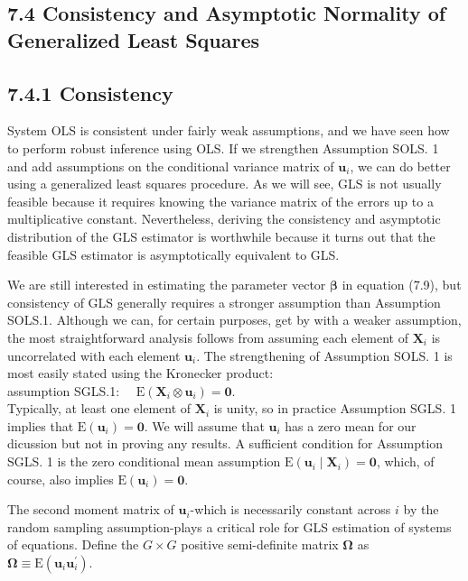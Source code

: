 \documentclass[10pt]{article}
\begin{document}
\subsection*{7.4 Consistency and Asymptotic Normality of Generalized Least Squares}
\subsection*{7.4.1 Consistency}
System OLS is consistent under fairly weak assumptions, and we have seen how to perform robust inference using OLS. If we strengthen Assumption SOLS. 1 and add assumptions on the conditional variance matrix of $\mathbf{u}_{i}$, we can do better using a generalized least squares procedure. As we will see, GLS is not usually feasible because it requires knowing the variance matrix of the errors up to a multiplicative constant. Nevertheless, deriving the consistency and asymptotic distribution of the GLS estimator is worthwhile because it turns out that the feasible GLS estimator is asymptotically equivalent to GLS.

We are still interested in estimating the parameter vector $\boldsymbol{\beta}$ in equation (7.9), but consistency of GLS generally requires a stronger assumption than Assumption SOLS.1. Although we can, for certain purposes, get by with a weaker assumption, the most straightforward analysis follows from assuming each element of $\mathbf{X}_{i}$ is uncorrelated with each element $\mathbf{u}_{i}$. The strengthening of Assumption SOLS. 1 is most easily stated using the Kronecker product:\\
assumption SGLS.1: $\quad \mathrm{E}\left(\mathbf{X}_{i} \otimes \mathbf{u}_{i}\right)=\mathbf{0}$.\\
Typically, at least one element of $\mathbf{X}_{i}$ is unity, so in practice Assumption SGLS. 1 implies that $\mathrm{E}\left(\mathbf{u}_{i}\right)=\mathbf{0}$. We will assume that $\mathbf{u}_{i}$ has a zero mean for our dicussion but not in proving any results. A sufficient condition for Assumption SGLS. 1 is the zero conditional mean assumption $\mathrm{E}\left(\mathbf{u}_{i} \mid \mathbf{X}_{i}\right)=\mathbf{0}$, which, of course, also implies $\mathrm{E}\left(\mathbf{u}_{i}\right)=\mathbf{0}$.

The second moment matrix of $\mathbf{u}_{i}$-which is necessarily constant across $i$ by the random sampling assumption-plays a critical role for GLS estimation of systems of equations. Define the $G \times G$ positive semi-definite matrix $\boldsymbol{\Omega}$ as\\
$\boldsymbol{\Omega} \equiv \mathrm{E}\left(\mathbf{u}_{i} \mathbf{u}_{i}^{\prime}\right)$.
\end{document}
